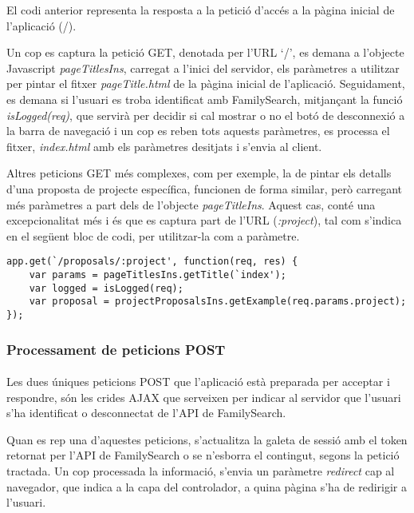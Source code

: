     El codi anterior representa la resposta a la petició d'accés a la pàgina inicial de l'aplicació (/).

    Un cop es captura la petició GET, denotada per l'URL `/',  es demana a l'objecte Javascript \emph{pageTitlesIns}, carregat a l'inici del servidor, els paràmetres a utilitzar per pintar el fitxer \emph{pageTitle.html} de la pàgina inicial de l'aplicació. Seguidament, es demana si l’usuari es troba identificat amb FamilySearch, mitjançant la funció \emph{isLogged(req)}, que servirà per decidir si cal mostrar o no el botó de desconnexió a la barra de navegació i un cop es reben tots aquests paràmetres, es processa el fitxer, \emph{index.html} amb els paràmetres desitjats i s'envia al client.

    Altres peticions GET més complexes, com per exemple, la de pintar els detalls d'una proposta de projecte específica, funcionen de forma similar, però carregant més paràmetres a part dels de l'objecte \emph{pageTitleIns}. Aquest cas, conté una ex\-cep\-cio\-na\-li\-tat més i és que es captura part de l'URL (\emph{:project}), tal com s'indica en el següent bloc de codi, per utilitzar-la com a paràmetre.

    \begin{lstlisting}[style=rawOwn,caption={Exemple d'utilització com a paràmetre, d'una part de l'URL}]
app.get(`/proposals/:project', function(req, res) {
    var params = pageTitlesIns.getTitle(`index');
    var logged = isLogged(req);
    var proposal = projectProposalsIns.getExample(req.params.project);
});
    \end{lstlisting}


    \subsubsection{Processament de peticions POST}

    \paragraph{}
    Les dues úniques peticions POST que l'aplicació està preparada per acceptar i respondre, són les crides AJAX que serveixen per indicar al servidor que l'usuari s'ha identificat o desconnectat de l'API de FamilySearch.

    Quan es rep una d'aquestes peticions, s'actualitza la galeta de sessió amb el token retornat per l'API de FamilySearch o se n'esborra el contingut, segons la petició tractada. Un cop processada la informació, s'envia un paràmetre \emph{redirect} cap al navegador, que indica a la capa del controlador, a quina pàgina s'ha de redirigir a l'usuari.


